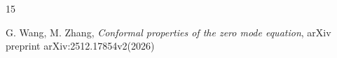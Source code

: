 \documentclass[11pt]{amsart}
\theoremstyle{plain}
\numberwithin{equation}{section}
\theoremstyle{plain}
\begin{document}
\begin{thebibliography}{15}



 G. Wang, M. Zhang, {\it Conformal properties of the zero mode equation}, arXiv preprint arXiv:2512.17854v2(2026)

\end{thebibliography}
\end{document}
